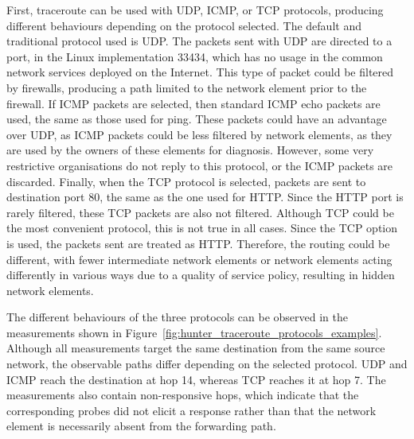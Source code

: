 \documentclass[
A4paper,                %
twoside,                %
openright,              %
chapterprefix=true,     %
12pt,                   %
headings=normal,        %
titlepage=on            %
]{book}
\begin{document}
First, traceroute can be used with UDP, ICMP, or TCP protocols, producing different behaviours depending on the protocol selected. The default and traditional protocol used is UDP. The packets sent with UDP are directed to a port, in the Linux implementation \cite{Traceroute8Page} 33434, which has no usage in the common network services deployed on the Internet. This type of packet could be filtered by firewalls, producing a path limited to the network element prior to the firewall. If ICMP packets are selected, then standard ICMP echo packets are used, the same as those used for ping. These packets could have an advantage over UDP, as ICMP packets could be less filtered by network elements, as they are used by the owners of these elements for diagnosis. However, some very restrictive organisations do not reply to this protocol, or the ICMP packets are discarded. Finally, when the TCP protocol is selected, packets are sent to destination port 80, the same as the one used for HTTP. Since the HTTP port is rarely filtered, these TCP packets are also not filtered. Although TCP could be the most convenient protocol, this is not true in all cases. Since the TCP option is used, the packets sent are treated as HTTP. Therefore, the routing could be different, with fewer intermediate network elements or network elements acting differently in various ways due to a quality of service policy, resulting in hidden network elements.

The different behaviours of the three protocols can be observed in the measurements shown in Figure~\ref{fig:hunter_traceroute_protocols_examples}. Although all measurements target the same destination from the same source network, the observable paths differ depending on the selected protocol. UDP and ICMP reach the destination at hop 14, whereas TCP reaches it at hop 7. The measurements also contain non-responsive hops, which indicate that the corresponding probes did not elicit a response rather than that the network element is necessarily absent from the forwarding path.
\end{document}

